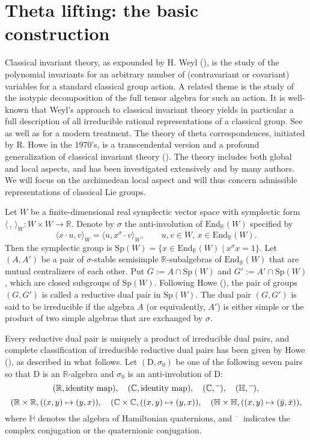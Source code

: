 \documentclass[lang = american]{ems-icm} %
\newcommand{\R}{\mathbb R}
\renewcommand{\H}{\mathbb H}
\def\Sp{{\mathrm{Sp}}}
\newcommand{\rD}{\mathrm D}
\numberwithin{equation}{section}
\theoremstyle{remark}
\begin{document}


\section{Theta lifting: the basic construction}\label{sec1}


Classical invariant theory, as expounded by H. Weyl (\cite{Wey}), is the study of the polynomial invariants for an arbitrary number of (contravariant or covariant) variables for a standard classical group action. A related theme is the study of the isotypic decomposition of the full tensor
algebra for such an action.  It is well-known that Weyl's approach to classical invariant theory yields in particular a full description of all irreducible rational representations of a classical group. See \cite{Ho2} as well as \cites{KV,GW} for a modern treatment. The theory of theta correspondences, initiated by R. Howe in the 1970's, is a transcendental version and a profound generalization of classical invariant theory (\cites{Ho1,Ho3}). The theory includes both global and local aspects, and has been investigated extensively and by many authors. We will focus on the archimedean local aspect and will thus concern admissible representations of classical Lie groups.

Let $W$ be a finite-dimensional real symplectic vector space with symplectic form $\langle \,,\, \rangle_W: W\times W\rightarrow \R$.
Denote by $\sigma$ the anti-involution of $\mathrm{End}_\R(W)$ specified by
\[
   \langle x\cdot u, v\rangle_W=\langle u, x^\sigma\cdot v\rangle_W, \qquad u,v\in W,\,x\in \mathrm{End}_\R(W).
\]
Then the symplectic group is $\Sp(W)=\{x\in \mathrm{End}_\R(W)\mid x^\sigma x=1\}$.
Let $(A, A')$ be a pair of $\sigma$-stable semisimple $\R$-subalgebras of $\mathrm{End}_\R(W)$ that are mutual centralizers of each other. Put $G:=A\cap \Sp(W)$ and $G':=A'\cap \Sp(W)$, which are closed subgroups of $\Sp(W)$. Following Howe (\cite{Ho1}), the pair of groups $(G,G')$ is called a reductive dual pair in $\Sp(W)$. The dual pair $(G, G')$ is said to be irreducible if the algebra $A$ (or equivalently, $A'$) is either simple or the product of two simple algebras that are exchanged by $\sigma$.

Every reductive dual pair is uniquely a product of  irreducible dual pairs, and  complete classification of irreducible reductive dual pairs has been given by Howe (\cite{Ho1,MVW}), as described in what follows. Let $(\rD, \sigma_0)$ be one of the following seven pairs so that $\rD$ is an $\R$-algebra and $\sigma_0$ is an anti-involution of $\rD$:
\[
 (\R, \textrm{identity map}), \quad (\C, \textrm{identity map}),\quad (\C, \overline{\phantom a}), \quad (\H,  \overline{\phantom a}),
 \]
 \[
 (\R\times \R, ((x,y)\mapsto (y,x)),\quad (\C\times \C, ((x,y)\mapsto (y,x)),\quad (\H\times \H, ((x,y)\mapsto (\bar y,\bar x)),
\]
where $\H$ denotes the algebra of Hamiltonian quaternions, and  $\overline{\phantom a}\,$ indicates the complex conjugation or the quaternionic conjugation.
\end{document}
